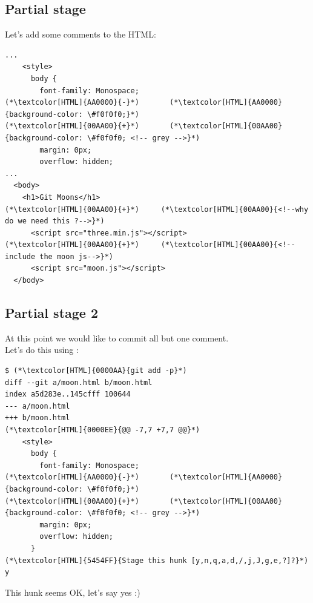\subsection{Partial stage}
\begin{frame}[fragile]
  \subslidetitle
  Let's add some comments to the HTML:

  \begin{lstlisting}
...
    <style>
      body {
        font-family: Monospace;
(*\textcolor[HTML]{AA0000}{-}*)       (*\textcolor[HTML]{AA0000}{background-color: \#f0f0f0;}*)
(*\textcolor[HTML]{00AA00}{+}*)       (*\textcolor[HTML]{00AA00}{background-color: \#f0f0f0; <!-- grey -->}*)
        margin: 0px;
        overflow: hidden;
...
  <body>
    <h1>Git Moons</h1>
(*\textcolor[HTML]{00AA00}{+}*)     (*\textcolor[HTML]{00AA00}{<!--why do we need this ?-->}*)
      <script src="three.min.js"></script>
(*\textcolor[HTML]{00AA00}{+}*)     (*\textcolor[HTML]{00AA00}{<!--include the moon js-->}*)
      <script src="moon.js"></script>
  </body>
\end{lstlisting}
\end{frame}

\subsection{Partial stage 2}
\begin{frame}[fragile]
  \subslidetitle
  At this point we would like to commit all but one comment.
  \\
  Let's do this using :
  \begin{lstlisting}
$ (*\textcolor[HTML]{0000AA}{git add -p}*)
diff --git a/moon.html b/moon.html
index a5d283e..145cfff 100644
--- a/moon.html
+++ b/moon.html
(*\textcolor[HTML]{0000EE}{@@ -7,7 +7,7 @@}*)
    <style>
      body {
        font-family: Monospace;
(*\textcolor[HTML]{AA0000}{-}*)       (*\textcolor[HTML]{AA0000}{background-color: \#f0f0f0;}*)
(*\textcolor[HTML]{00AA00}{+}*)       (*\textcolor[HTML]{00AA00}{background-color: \#f0f0f0; <!-- grey -->}*)
        margin: 0px;
        overflow: hidden;
      }
(*\textcolor[HTML]{5454FF}{Stage this hunk [y,n,q,a,d,/,j,J,g,e,?]?}*) y
\end{lstlisting}
  This hunk seems OK, let's say yes :)
\end{frame}

